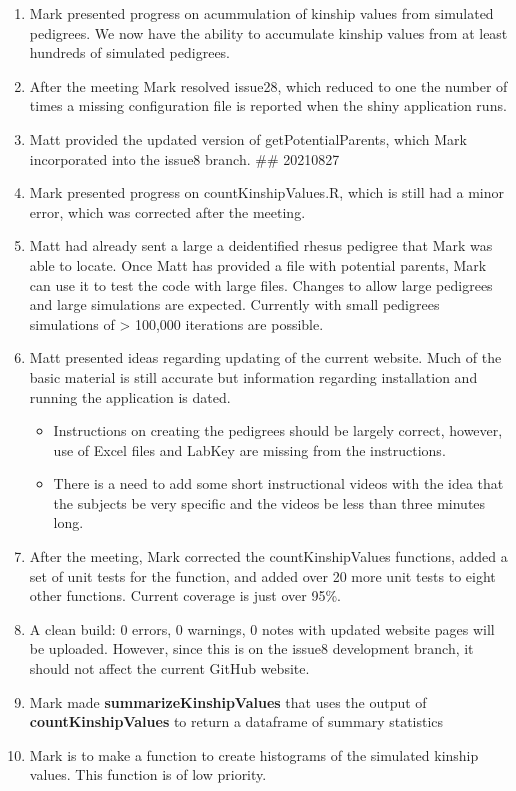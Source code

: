 \documentclass[
]{article}
\providecommand{\tightlist}{%
  \setlength{\itemsep}{0pt}\setlength{\parskip}{0pt}}
\begin{document}
\begin{enumerate}
\def\labelenumi{\arabic{enumi}.}
\tightlist
\item
  Mark presented progress on acummulation of kinship values from
  simulated pedigrees. We now have the ability to accumulate kinship
  values from at least hundreds of simulated pedigrees.
\item
  After the meeting Mark resolved issue28, which reduced to one the
  number of times a missing configuration file is reported when the
  shiny application runs.
\item
  Matt provided the updated version of getPotentialParents, which Mark
  incorporated into the issue8 branch. \#\# 20210827
\item
  Mark presented progress on countKinshipValues.R, which is still had a
  minor error, which was corrected after the meeting.
\item
  Matt had already sent a large a deidentified rhesus pedigree that Mark
  was able to locate. Once Matt has provided a file with potential
  parents, Mark can use it to test the code with large files. Changes to
  allow large pedigrees and large simulations are expected. Currently
  with small pedigrees simulations of \textgreater{} 100,000 iterations
  are possible.
\item
  Matt presented ideas regarding updating of the current website. Much
  of the basic material is still accurate but information regarding
  installation and running the application is dated.

  \begin{itemize}
  \tightlist
  \item
    Instructions on creating the pedigrees should be largely correct,
    however, use of Excel files and LabKey are missing from the
    instructions.
  \item
    There is a need to add some short instructional videos with the idea
    that the subjects be very specific and the videos be less than three
    minutes long.
  \end{itemize}
\item
  After the meeting, Mark corrected the countKinshipValues functions,
  added a set of unit tests for the function, and added over 20 more
  unit tests to eight other functions. Current coverage is just over
  95\%.
\item
  A clean build: 0 errors, 0 warnings, 0 notes with updated website
  pages will be uploaded. However, since this is on the issue8
  development branch, it should not affect the current GitHub website.
\item
  Mark made \textbf{summarizeKinshipValues} that uses the output of
  \textbf{countKinshipValues} to return a dataframe of summary
  statistics
\item
  Mark is to make a function to create histograms of the simulated
  kinship values. This function is of low priority.
\end{enumerate}
\end{document}
